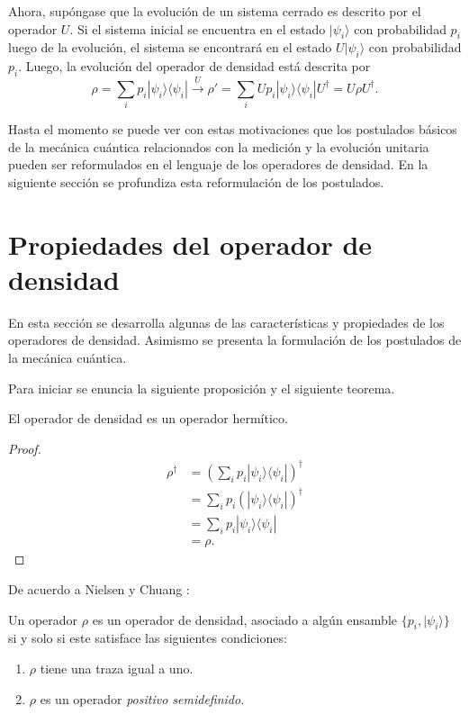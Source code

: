  
 Ahora, supóngase que la evolución de un sistema cerrado es descrito por el operador $U$. Si el sistema inicial se encuentra en el estado $|\psi_i\rangle$ con probabilidad $p_i$ luego de la evolución, el sistema se encontrará en el estado $U|\psi_i\rangle$ con probabilidad $p_i$. Luego, la evolución del operador de densidad está descrita por {\cite{nielsen_chuang_2010}}\[\rho=\sum_{i}p_i|\psi_i\rangle \langle \psi_i|\xrightarrow{U}\rho'=\sum_{i}Up_i|\psi_i\rangle \langle \psi_i|U^{\dagger}=U\rho U^{\dagger}.\]


Hasta el momento se puede ver con estas motivaciones que los postulados básicos de la mecánica cuántica relacionados con la medición y la evolución unitaria pueden ser reformulados en el lenguaje de los operadores de densidad. En la siguiente sección se profundiza esta reformulación de los postulados.


\section{Propiedades del operador de densidad}\label{postulates} %

En esta sección se desarrolla algunas de las características y propiedades de
los operadores de densidad. Asimismo se presenta la formulación de los
postulados de la mecánica cuántica. 

Para iniciar se enuncia la siguiente proposición y el siguiente teorema. 

\begin{proposition}El operador de densidad es un operador hermítico.
	
\end{proposition}


\begin{proof}
	\begin{equation}
		\begin{split}
			\rho^\dagger&={\left(\sum_{i} p_i|\psi_i\rangle \langle \psi_i|\right)}^{\dagger}\\
			&=\sum_{i} p_i {\left(|\psi_i\rangle \langle\psi_i|\right)}^{\dagger}\\
			&=\sum_{i} p_i |\psi_i\rangle \langle\psi_i|\\
			&=\rho.
		\end{split}
	\end{equation}
	
\end{proof}

De acuerdo a Nielsen y Chuang {\cite{nielsen_chuang_2010}}:\begin{theorem} Un operador $\rho$ es un operador de densidad, asociado a algún ensamble $\{p_i, |\psi_i\rangle\}$ si y solo si este satisface las siguientes condiciones:
\begin{enumerate}
	\item $\rho$ tiene una traza igual a uno.
	\item $\rho $ es un operador \textit{positivo semidefinido}.
\end{enumerate}	
\end{theorem}


